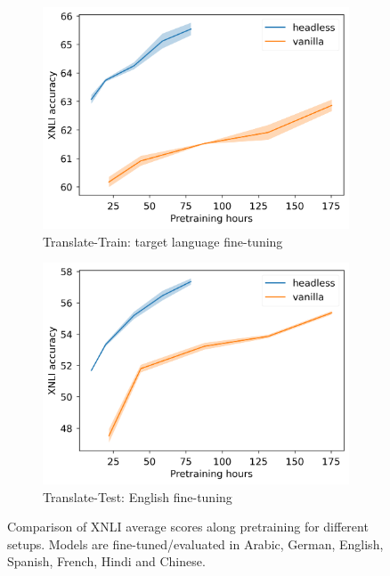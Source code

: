 \begin{figure}[h]
    \centering
    \begin{subfigure}[b]{0.42\columnwidth}
         \includegraphics[width=\linewidth]{sources/part_2/headless/imgs/xnli_translate_train_p13.png}
         \caption{Translate-Train: target language fine-tuning}
         \label{fig:translate_train}
    \end{subfigure}
    \begin{subfigure}[b]{0.42\columnwidth}
         \includegraphics[width=\linewidth]{sources/part_2/headless/imgs/xnli_cross_p13.png}
         \caption{Translate-Test: English fine-tuning}
         \label{fig:translate_test}
    \end{subfigure}
    \caption{Comparison of XNLI average scores along pretraining for different setups. Models are fine-tuned/evaluated in Arabic, German, English, Spanish, French, Hindi and Chinese. %
    }
    \label{fig:train_curve_multilm}
\end{figure}

